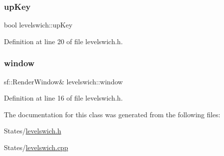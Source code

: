 \subsubsection{\texorpdfstring{up\+Key}{upKey}}
{\footnotesize\ttfamily bool levelswich\+::up\+Key}



Definition at line 20 of file levelswich.\+h.

\hypertarget{classlevelswich_af2e53af5be069bb83ea55370bf8a958f}{}\label{classlevelswich_af2e53af5be069bb83ea55370bf8a958f} 
\subsubsection{\texorpdfstring{window}{window}}
{\footnotesize\ttfamily sf\+::\+Render\+Window\& levelswich\+::window}



Definition at line 16 of file levelswich.\+h.



The documentation for this class was generated from the following files\+:\begin{DoxyCompactItemize}
\item 
States/\hyperlink{levelswich_8h}{levelswich.\+h}\item 
States/\hyperlink{levelswich_8cpp}{levelswich.\+cpp}\end{DoxyCompactItemize}
